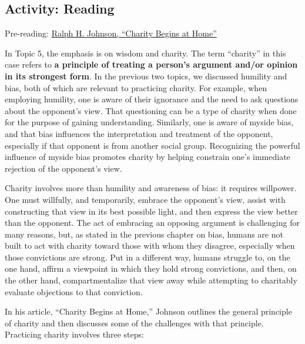 \documentclass[
]{book}
\begin{document}
\hypertarget{activity-reading-4}{%
\subsection*{Activity: Reading}\label{activity-reading-4}}

\begin{reflect}
Pre-reading: \href{assets/u1/CharityBeginsatHome.pdf}{Ralph H. Johnson, ``Charity Begins at Home''}
\end{reflect}

In Topic 5, the emphasis is on wisdom and charity. The term ``charity'' in this case refers to \textbf{a principle of treating a person's argument and/or opinion in its strongest form}. In the previous two topics, we discussed humility and bias, both of which are relevant to practicing charity. For example, when employing humility, one is aware of their ignorance and the need to ask questions about the opponent's view. That questioning can be a type of charity when done for the purpose of gaining understanding. Similarly, one is aware of myside bias, and that bias influences the interpretation and treatment of the opponent, especially if that opponent is from another social group. Recognizing the powerful influence of myside bias promotes charity by helping constrain one's immediate rejection of the opponent's view.

Charity involves more than humility and awareness of bias: it requires willpower. One must willfully, and temporarily, embrace the opponent's view, assist with constructing that view in its best possible light, and then express the view better than the opponent. The act of embracing an opposing argument is challenging for many reasons, but, as stated in the previous chapter on bias, humans are not built to act with charity toward those with whom they disagree, especially when those convictions are strong. Put in a different way, humans struggle to, on the one hand, affirm a viewpoint in which they hold strong convictions, and then, on the other hand, compartmentalize that view away while attempting to charitably evaluate objections to that conviction.

In his article, ``Charity Begins at Home,'' Johnson outlines the general principle of charity and then discusses some of the challenges with that principle. Practicing charity involves three steps:
\end{document}
